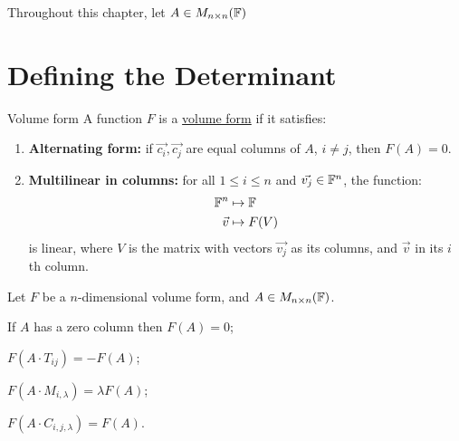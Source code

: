 \documentclass[../Main.tex]{subfiles}
\begin{document}
Throughout this chapter, let $A \in M_{n \times n}(\mathbb{F})$
\section{Defining the Determinant}
\begin{definition}{Volume form}
    A function $F$ is a \underline{volume form} if it satisfies:
    \begin{enumerate}
        \item \textbf{Alternating form:} if $\vec{c_i}, \vec{c_j}$ are equal columns of $A$, $i \neq j$, then $F(A) = 0$.
        \item \textbf{Multilinear in columns:} for all $1 \leq i \leq n$ and $\vec{v_j} \in \mathbb{F}^n$, the function:
        \begin{align*}
            \mathbb{F}^n &\mapsto \mathbb{F}\\
            \vec{v} &\mapsto F(V)
        \end{align*}
        is linear, where $V$ is the matrix with vectors $\vec{v_j}$ as its columns, and $\vec{v}$ in its $i$th column.
    \end{enumerate}
\end{definition}
\begin{propositions}{
        Let $F$ be a $n$-dimensional volume form, and $A \in M_{n \times n}(\mathbb{F})$.
        \label{propsVolForm}
    }
    \item If $A$ has a zero column then $F(A) = 0$; \label{propVFZeroColumn}
    \item $F(A \cdot T_{ij}) = -F(A)$; \label{propVFColSwap}
    \item $F(A \cdot M_{i, \lambda}) = \lambda F(A)$; \label{propVFColScale}
    \item $F(A \cdot C_{i, j, \lambda}) = F(A)$. \label{propVFColAdd}
\end{propositions}
\end{document}
